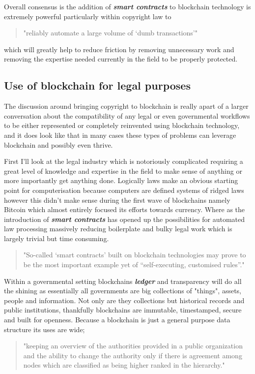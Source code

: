 \documentclass[12pt]{report}
\newcommand{\keyword}[1]{\textbf{\textit{#1}}}
\begin{document}
Overall consensus is the addition of \keyword{smart contracts} to blockchain technology is extremely powerful particularly within copyright law to \begin{quote}"reliably automate a large volume of ‘dumb transactions’" \cite{missing_link_in_copyright_licensing}\end{quote} which will greatly help to reduce friction by removing unnecessary work and removing the expertise needed currently in the field to be properly protected.

\subsection{Use of blockchain for legal purposes}

The discussion around bringing copyright to blockchain is really apart of a larger conversation about the compatibility of any legal or even governmental workflows to be either represented or completely reinvented using blockchain technology, and it does look like that in many cases these types of problems can leverage blockchain and possibly even thrive.

First I'll look at the legal industry which is notoriously complicated requiring a great level of knowledge and expertise in the field to make sense of anything or more importantly get anything done. Logically laws make an obvious starting point for computerisation because computers are defined systems of ridged laws however this didn't make sense during the first wave of blockchains namely Bitcoin which almost entirely focused its efforts towards currency. Where as the introduction of \keyword{smart contracts} has opened up the possibilities for automated law processing massively reducing boilerplate and bulky legal work which is largely trivial but time consuming.

\begin{quote}
	"So-called ‘smart contracts’ built on blockchain technologies may prove to be the most important example yet of “self-executing, customised rules”." \cite{MILLARD2018843}
\end{quote}

Within a governmental setting blockchains \keyword{ledger} and transparency will do all the shining as essentially all governments are big collections of "things", assets, people and information. Not only are they collections but historical records and public institutions, thankfully blockchains are immutable, timestamped, secure and built for openness. Because a blockchain is just a general purpose data structure its uses are wide; \begin{quote}"keeping an overview of the authorities provided in a public organization and the ability to change the authority only if there is agreement among nodes which are classified as being higher ranked in the hierarchy." \cite{OLNES2017355}\end{quote}
\end{document}
